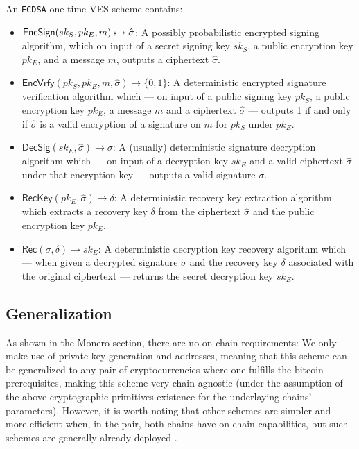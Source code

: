 \documentclass{llncs}
\newcommand{\EncSign}{\textsf{EncSign}}
\newcommand{\EncVer}{\textsf{EncVrfy}}
\newcommand{\DecSig}{\textsf{DecSig}}
\newcommand{\Rec}{\textsf{Rec}}
\newcommand{\RecKey}{\textsf{RecKey}}
\newcommand{\hatsigma}{\hat{\sigma}}
\newcommand{\skSign}{sk_S}
\newcommand{\pkSign}{pk_S}
\newcommand{\skEnc}{sk_E}
\newcommand{\pkEnc}{pk_E}
\newcommand{\rec}{\delta}
\newcommand{\bin}{\{0,1\}}
\begin{document}
\begin{definition}
    An \texttt{ECDSA} one-time VES scheme contains:
\begin{itemize}
    \item $\EncSign(\skSign, \pkEnc, m) \hskip2.3pt{\mbox{\tiny${\$}$\normalsize}}\!\!\rightarrow \hatsigma$: A possibly probabilistic encrypted signing algorithm, which on input of a secret signing key $\skSign$, a public encryption key $\pkEnc$, and a message $m$, outputs a ciphertext $\hatsigma$.
    \item $\EncVer(\pkSign, \pkEnc, m, \hatsigma) \rightarrow \bin$: A deterministic encrypted signature verification algorithm which --- on input of a public signing key $\pkSign$, a public encryption key $\pkEnc$, a message $m$ and a ciphertext $\hatsigma$ --- outputs 1 if and only if $\hatsigma$ is a valid encryption of a signature on $m$ for $\pkSign$ under $\pkEnc$.
    \item $\DecSig(\skEnc, \hatsigma) \rightarrow \sigma$: A (usually) deterministic signature decryption algorithm which --- on input of a decryption key $\skEnc$ and a valid ciphertext $\hatsigma$ under that encryption key --- outputs a valid signature $\sigma$.
    \item $\RecKey(\pkEnc, \hatsigma) \rightarrow \delta$: A deterministic recovery key extraction algorithm which extracts a recovery key $\delta$ from the ciphertext $\hatsigma$ and the public encryption key $\pkEnc$.
    \item $\Rec(\sigma,\rec) \rightarrow \skEnc$: A deterministic decryption key recovery algorithm which --- when given a decrypted signature $\sigma$ and the recovery key $\rec$ associated with the original ciphertext --- returns the secret decryption key $\skEnc$.
\end{itemize}
\end{definition}

\subsection{Generalization}
As shown in the Monero section, there are no on-chain requirements: We only make use of private key generation and addresses, meaning that this scheme can be generalized to any pair of cryptocurrencies where one fulfills the bitcoin prerequisites, making this scheme very chain agnostic (under the assumption of the above cryptographic primitives existence for the underlaying chains' parameters). However, it is worth noting that other schemes are simpler and more efficient when, in the pair, both
chains have on-chain capabilities, but such schemes are generally already deployed \cite{atomic-swap, scriptless-atomic-swap}.
\end{document}
